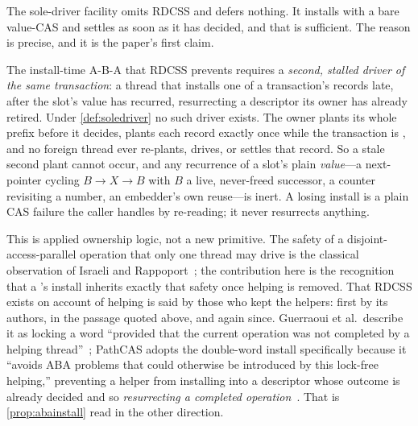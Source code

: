\documentclass[11pt]{article}
\begin{document}
The sole-driver facility omits RDCSS and defers nothing. It installs with a bare
value-CAS and settles as soon as it has decided, and that is sufficient. The
reason is precise, and it is the paper's first claim.

\begin{property}
\label{prop:abainstall}
The install-time A-B-A that RDCSS prevents requires a \emph{second, stalled
driver of the same transaction}: a thread that installs one of a transaction's
records late, after the slot's value has recurred, resurrecting a descriptor its
owner has already retired. Under \cref{def:soledriver} no such driver exists.
The owner plants its whole prefix before it decides, plants each record exactly
once while the transaction is \UNDECIDED, and no foreign thread ever re-plants,
drives, or settles that record. So a stale second plant cannot occur, and any
recurrence of a slot's plain \emph{value}---a next-pointer cycling
$B \rightarrow X \rightarrow B$ with $B$ a live, never-freed successor, a counter
revisiting a number, an embedder's own reuse---is inert. A losing install is a
plain CAS failure the caller handles by re-reading; it never resurrects anything.
\end{property}

This is applied ownership logic, not a new primitive. The safety of a
disjoint-access-parallel operation that only one thread may drive is the
classical observation of Israeli and Rappoport~\citep{israeli1994disjoint}; the
contribution here is the recognition that a \pseudotxn's install inherits exactly
that safety once helping is removed. That RDCSS exists on account of helping is
said by those who kept the helpers: first by its authors, in the passage quoted
above, and again since. Guerraoui et al.\ describe it as locking a
word ``provided that the current operation was not completed by a helping
thread''~\citep{guerraoui2020mcas}; PathCAS adopts the double-word install
specifically because it ``avoids ABA problems that could otherwise be introduced
by this lock-free helping,'' preventing a helper from installing into a
descriptor whose outcome is already decided and so \emph{resurrecting a completed
operation}~\citep{brown2022pathcas}. That is \cref{prop:abainstall} read in the
other direction.
\end{document}
